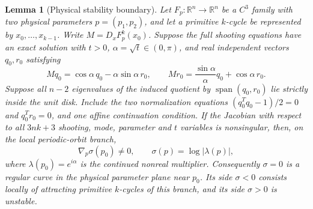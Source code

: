 \documentclass[11pt,letterpaper]{article}
\newtheorem{lemma}{Lemma}
\begin{document}
\begin{lemma}[Physical stability boundary]\label{lem:physical-boundary}
Let $F_p:\mathbb R^n\to\mathbb R^n$ be a $C^3$ family with two physical
parameters $p=(p_1,p_2)$, and let a primitive $k$-cycle be represented by
$x_0,\ldots,x_{k-1}$. Write $M=D_xF_p^k(x_0)$.
Suppose the full shooting equations have an exact solution with $t>0$,
$\alpha=\sqrt t\in(0,\pi)$, and real independent vectors $q_0,r_0$ satisfying
\[
 Mq_0=\cos\alpha\,q_0-\alpha\sin\alpha\,r_0,
 \qquad Mr_0=\frac{\sin\alpha}{\alpha}q_0+\cos\alpha\,r_0.
\]
Suppose all $n-2$ eigenvalues of the induced quotient by
$\operatorname{span}(q_0,r_0)$ lie strictly inside the unit disk.
Include the two normalization equations
$(q_0^Tq_0-1)/2=0$ and $q_0^Tr_0=0$, and one affine continuation condition.
If the Jacobian with respect to all $3nk+3$ shooting, mode, parameter and
$t$ variables is nonsingular, then, on the local periodic-orbit branch,
\[
 \nabla_p\sigma(p_0)\ne0,\qquad
 \sigma(p)=\log|\lambda(p)|,
\]
where $\lambda(p_0)=e^{i\alpha}$ is the continued nonreal multiplier.
Consequently $\sigma=0$ is a regular curve in the physical parameter plane
near $p_0$. Its side $\sigma<0$ consists locally of attracting primitive
$k$-cycles of this branch, and its side $\sigma>0$ is unstable.
\end{lemma}
\end{document}
